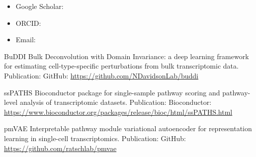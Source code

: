 
\begin{itemize}
  \item Google Scholar: 
  \item ORCID: 
  \item Email: 
\end{itemize}


\software
  {BuDDI}
  {Bulk Deconvolution with Domain Invariance: a deep learning framework for estimating cell-type-specific perturbations from bulk transcriptomic data.}
  {Publication: \cite{davidson2025buddi} \quad GitHub: \url{https://github.com/NDavidsonLab/buddi}}

\software
  {ssPATHS}
  {Bioconductor package for single-sample pathway scoring and pathway-level analysis of transcriptomic datasets.}
  {Publication: \cite{markolin2021identification} \quad Bioconductor: \url{https://www.bioconductor.org/packages/release/bioc/html/ssPATHS.html}}

\software
  {pmVAE}
  {Interpretable pathway module variational autoencoder for representation learning in single-cell transcriptomics.}
  {Publication: \cite{stark2021pmvae} \quad GitHub: \url{https://github.com/ratschlab/pmvae}}
